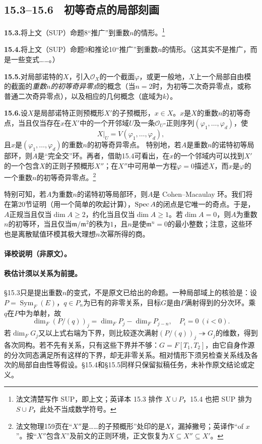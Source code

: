 \subsection*{15.3--15.6　初等奇点的局部刻画}
\begingroup
\def\OO{\mathcal O}\def\m{\mathfrak m}\def\mm{\mathfrak m}\def\Sym{\operatorname{Sym}}
\noindent\textbf{15.3.}\quad 将上文（SUP）命题8“推广”到重数$n$的情形。\footnote{法文清楚写作 SUP，即上文；英译本 15.3 排作 $X\cup P$，15.4 也把 SUP 排为 $S\cup P$，此处不当成数学符号。}

\noindent\textbf{15.4.}\quad 将上文（SUP）命题9和推论10“推广”到重数$n$的情形。（这其实不是推广，而是一些变式……。）

\noindent\textbf{15.5.}\quad 对局部诺特的$X$，引入$\OO_X$的一个截面$\varphi$，或更一般地，$X$上一个局部自由模的截面的\emph{重数$n$的初等奇异零点}的概念（当$n=2$时，为初等二次奇异零点，或称普通二次奇异零点），以及相应的几何概念（底域为$k$）。

\noindent\textbf{15.6.}\quad 设$X$是局部诺特正则预概形$X'$的子预概形，$x\in X$。$x$是$X$的重数$n$的初等奇点，当且仅当存在$x$在$X'$中的一个开邻域$U$及一条$\OO_U$-正则序列$(\varphi_1,\ldots,\varphi_d)$，使
\[
X|_U=V(\varphi_1,\ldots,\varphi_d),
\]
且$x$是$(\varphi_1,\ldots,\varphi_d)$的重数$n$的初等奇异零点。
特别地，若$A$是重数$n$的诺特初等局部环，则$A$是“完全交”环。再者，借助15.4可看出，在$x$的一个邻域内可以找到$X'$的一个包含$X$的正则子预概形$X''$；在$X''$中可用单一方程$\varphi=0$描述$X$，而$x$是$\varphi$的一个重数$n$的初等奇异零点。\footnote{法文物理159页在“$X''$是……的子预概形”处印的是$X$，漏掉撇号；英译作“of $x$”。按“$X''$包含$X$”及前文的正则环境，正文恢复为$X\subseteq X''\subseteq X'$。}

特别可知，若$A$为重数$n$的诺特初等局部环，则$A$是 Cohen--Macaulay 环。我们将在第20节证明（用一个简单的吹起计算），$\operatorname{Spec} A$的闭点是它唯一的奇点。于是，$A$正规当且仅当$\dim A\ge2$，约化当且仅当$\dim A\ge1$。若$\dim A=0$，则$A$为重数$n$的初等环，当且仅当$\m/\m^2$的秩为$1$，且$n$是使$\m^n=0$的最小整数；注意，这些环也是离散赋值环模其极大理想$n$次幂所得的商。
\paragraph{译校说明（非原文）。}
\paragraph{秩估计须以关系为前提。}
§15.3只是提出重数$n$的变式，不是原文已给出的命题。一种局部域上的核验是：设$P=\Sym_F(E)$，$q\in P_n$为已有的非零关系，目标$G$是由$P$满射得到的分次环。乘$q$在$P$中为单射，故
\[
\dim_F(P/(q))_j=\dim_F P_j-\dim_F P_{j-n},\quad P_i=0\ (i<0).
\]
若$\dim_F G_j$又以上式右端为下界，则比较逐次满射$(P/(q))_j\twoheadrightarrow G_j$的维数，得到各次同构。若不先有关系，只有这些下界并不够：$G=F[T_1,T_2]$，由它自身作源的分次同态满足所有这样的下界，却无非零关系。相对情形下须另检查关系线及各次的局部自由性等假设。§15.4和§15.5同样只保留拟稿任务，未补作原文结论或定义。

